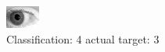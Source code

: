 \begin{figure}[h!]
\begin{center}
\includegraphics[width=0.60\columnwidth]{figures/ID252_class_4_target_3.png}
\end{center}
\caption{ Classification: 4 actual target: 3}
\label{fig:ID252_class_4_target_3}
\end{figure}
